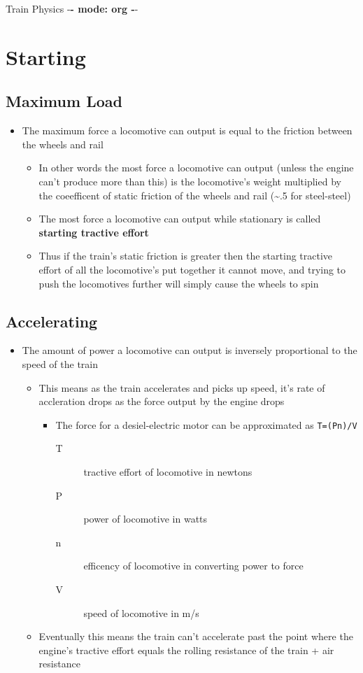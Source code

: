 \documentclass[11pt]{article}
\author{Stone}
\date{\today}
\title{}
\begin{document}
\tableofcontents

Train Physics -\textbf{- mode: org -}-

\section{Starting}
\label{sec:orga95f3ab}
\subsection{Maximum Load}
\label{sec:org806b88b}
\begin{itemize}
\item The maximum force a locomotive can output is equal to the friction
between the wheels and rail
\begin{itemize}
\item In other words the most force a locomotive can output (unless
the engine can't produce more than this) is the locomotive's
weight multiplied by the coeefficent of static friction of the
wheels and rail (\textasciitilde{}.5 for steel-steel)
\item The most force a locomotive can output while stationary is
called \textbf{starting tractive effort}
\item Thus if the train's static friction is greater then the starting
tractive effort of all the locomotive's put together it cannot
move, and trying to push the locomotives further will simply
cause the wheels to spin
\end{itemize}
\end{itemize}
\subsection{Accelerating}
\label{sec:org8a3720a}
\begin{itemize}
\item The amount of power a locomotive can output is inversely
proportional to the speed of the train
\begin{itemize}
\item This means as the train accelerates and picks up speed, it's
rate of accleration drops as the force output by the engine
drops
\begin{itemize}
\item The force for a desiel-electric motor can be approximated as
\texttt{T=(Pn)/V}
\begin{description}
\item[{T}] tractive effort of locomotive in newtons
\item[{P}] power of locomotive in watts
\item[{n}] efficency of locomotive in converting power to force
\item[{V}] speed of locomotive in m/s
\end{description}
\end{itemize}
\item Eventually this means the train can't accelerate past the point
where the engine's tractive effort equals the rolling resistance
of the train + air resistance
\end{itemize}
\end{itemize}
\end{document}
